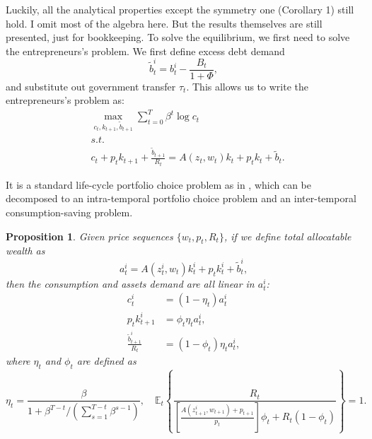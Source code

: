\documentclass[twoside,11pt,leqno]{article}
\newcommand{\E}{\mathbb{E}}
\newtheorem{proposition}{Proposition}
\begin{document}
Luckily, all the analytical properties except the symmetry one (Corollary 1) still hold. I omit most of the algebra here. But the results themselves are still presented, just for bookkeeping. To solve the equilibrium, we first need to solve the entrepreneurs's problem. We first define excess debt demand
\begin{equation*}
    \tilde{b}^i_t = b^i_t - \frac{B_t}{1+\Phi},
\end{equation*}
and substitute out government transfer $\tau_t$. This allows us to write the entrepreneurs's problem as:
\begin{align*}
    & \max_{c_t,k_{t+1},\tilde{b}_{t+1}} \sum_{t=0}^T \beta^t \log c_t \\
    & s.t. \\
    & c_t + p_t k_{t+1} + \frac{\tilde{b}_{t+1}}{R_t} = A(z_t,w_t)k_t + p_t k_t + \tilde{b}_t.
\end{align*}

It is a standard life-cycle portfolio choice problem as in \citet{Samuelson:1969}, which can be decomposed to an intra-temporal portfolio choice problem and an inter-temporal consumption-saving problem.
\begin{proposition}
\label{prop:lifecycle}
Given price sequences $\{w_t, p_t, R_t\}$, if we define total allocatable wealth as
\begin{equation*}
    a^i_t = A(z^i_t,w_t)k^i_t + p_t k^i_t + \tilde{b}^i_t,
\end{equation*}
then the consumption and assets demand are all linear in $a^i_t$:
\begin{align*}
    c^i_t &= (1-\eta_t)a^i_t \\
    p_t k^i_{t+1} &= \phi_t \eta_t a^i_t, \\
    \frac{\tilde{b}^i_{t+1}}{R_t} &= (1-\phi_t)\eta_t a^i_t,
\end{align*}
where $\eta_t$ and $\phi_t$ are defined as
\begin{equation*}
    \eta_t = \frac{\beta}{1+\beta^{T-t}/(\sum_{s=1}^{T-t}\beta^{s-1})},\quad \E_t \left\{\frac{R_t}{\left[\frac{A(z^i_{t+1},w_{t+1})+p_{t+1}}{p_t} \right]\phi_t + R_t(1-\phi_t)} \right\} = 1.
\end{equation*}
\end{proposition}
\end{document}
